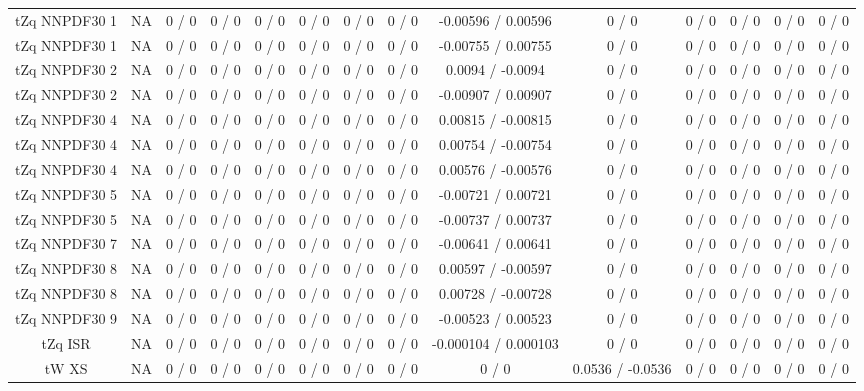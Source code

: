 \documentclass[10pt]{article}
\begin{document}
\begin{table}[htbp]
\begin{center}
\begin{tabular}{|c|c|c|c|c|c|c|c|c|c|c|c|c|c|}
  tZq NNPDF30 1 &    NA    & 0 / 0 & 0 / 0 & 0 / 0 & 0 / 0 & 0 / 0 & 0 / 0 & -0.00596 / 0.00596 & 0 / 0 & 0 / 0 & 0 / 0 & 0 / 0 & 0 / 0 \\ 
  tZq NNPDF30 1 &    NA    & 0 / 0 & 0 / 0 & 0 / 0 & 0 / 0 & 0 / 0 & 0 / 0 & -0.00755 / 0.00755 & 0 / 0 & 0 / 0 & 0 / 0 & 0 / 0 & 0 / 0 \\ 
  tZq NNPDF30 2 &    NA    & 0 / 0 & 0 / 0 & 0 / 0 & 0 / 0 & 0 / 0 & 0 / 0 & 0.0094 / -0.0094 & 0 / 0 & 0 / 0 & 0 / 0 & 0 / 0 & 0 / 0 \\ 
  tZq NNPDF30 2 &    NA    & 0 / 0 & 0 / 0 & 0 / 0 & 0 / 0 & 0 / 0 & 0 / 0 & -0.00907 / 0.00907 & 0 / 0 & 0 / 0 & 0 / 0 & 0 / 0 & 0 / 0 \\ 
  tZq NNPDF30 4 &    NA    & 0 / 0 & 0 / 0 & 0 / 0 & 0 / 0 & 0 / 0 & 0 / 0 & 0.00815 / -0.00815 & 0 / 0 & 0 / 0 & 0 / 0 & 0 / 0 & 0 / 0 \\ 
  tZq NNPDF30 4 &    NA    & 0 / 0 & 0 / 0 & 0 / 0 & 0 / 0 & 0 / 0 & 0 / 0 & 0.00754 / -0.00754 & 0 / 0 & 0 / 0 & 0 / 0 & 0 / 0 & 0 / 0 \\ 
  tZq NNPDF30 4 &    NA    & 0 / 0 & 0 / 0 & 0 / 0 & 0 / 0 & 0 / 0 & 0 / 0 & 0.00576 / -0.00576 & 0 / 0 & 0 / 0 & 0 / 0 & 0 / 0 & 0 / 0 \\ 
  tZq NNPDF30 5 &    NA    & 0 / 0 & 0 / 0 & 0 / 0 & 0 / 0 & 0 / 0 & 0 / 0 & -0.00721 / 0.00721 & 0 / 0 & 0 / 0 & 0 / 0 & 0 / 0 & 0 / 0 \\ 
  tZq NNPDF30 5 &    NA    & 0 / 0 & 0 / 0 & 0 / 0 & 0 / 0 & 0 / 0 & 0 / 0 & -0.00737 / 0.00737 & 0 / 0 & 0 / 0 & 0 / 0 & 0 / 0 & 0 / 0 \\ 
  tZq NNPDF30 7 &    NA    & 0 / 0 & 0 / 0 & 0 / 0 & 0 / 0 & 0 / 0 & 0 / 0 & -0.00641 / 0.00641 & 0 / 0 & 0 / 0 & 0 / 0 & 0 / 0 & 0 / 0 \\ 
  tZq NNPDF30 8 &    NA    & 0 / 0 & 0 / 0 & 0 / 0 & 0 / 0 & 0 / 0 & 0 / 0 & 0.00597 / -0.00597 & 0 / 0 & 0 / 0 & 0 / 0 & 0 / 0 & 0 / 0 \\ 
  tZq NNPDF30 8 &    NA    & 0 / 0 & 0 / 0 & 0 / 0 & 0 / 0 & 0 / 0 & 0 / 0 & 0.00728 / -0.00728 & 0 / 0 & 0 / 0 & 0 / 0 & 0 / 0 & 0 / 0 \\ 
  tZq NNPDF30 9 &    NA    & 0 / 0 & 0 / 0 & 0 / 0 & 0 / 0 & 0 / 0 & 0 / 0 & -0.00523 / 0.00523 & 0 / 0 & 0 / 0 & 0 / 0 & 0 / 0 & 0 / 0 \\ 
  tZq ISR &    NA    & 0 / 0 & 0 / 0 & 0 / 0 & 0 / 0 & 0 / 0 & 0 / 0 & -0.000104 / 0.000103 & 0 / 0 & 0 / 0 & 0 / 0 & 0 / 0 & 0 / 0 \\ 
  tW XS &    NA    & 0 / 0 & 0 / 0 & 0 / 0 & 0 / 0 & 0 / 0 & 0 / 0 & 0 / 0 & 0.0536 / -0.0536 & 0 / 0 & 0 / 0 & 0 / 0 & 0 / 0 \\ 

\end{tabular}
\end{center}
\end{table}
\end{document}
